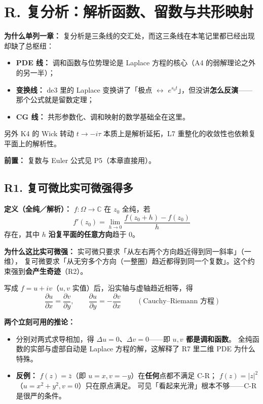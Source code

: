 \section{R. 复分析：解析函数、留数与共形映射}
\label{sec:complex}

\textbf{为什么单列一章：} 复分析是三条线的交汇处，而这三条线在本笔记里都已经出现却缺了总枢纽：
\begin{itemize}
  \item \textbf{PDE 线：} 调和函数与位势理论是 Laplace 方程的核心（A4 的弱解理论之外的另一半）；
  \item \textbf{变换线：} de3 里的 Laplace 变换讲了「极点 $\leftrightarrow$ $e^{s_0t}$」，但没讲\textbf{怎么反演}——
        那个公式就是留数定理；
  \item \textbf{CG 线：} 共形参数化、调和映射的数学基础全在这里。
\end{itemize}
另外 K4 的 Wick 转动 $t\to-i\tau$ 本质上是解析延拓，L7 重整化的收敛性也依赖复平面上的解析性。

\textbf{前置：} 复数与 Euler 公式见 P5（本章直接用）。

\subsection{R1. 复可微比实可微强得多}

\textbf{定义（全纯／解析）：} $f:\Omega\to\mathbb C$ 在 $z_0$ 全纯，若
\[
f'(z_0)=\lim_{h\to0}\frac{f(z_0+h)-f(z_0)}{h}
\]
存在，其中 $h$ \textbf{沿复平面的任意方向}趋于 $0$。

\textbf{为什么这比实可微强：} 实可微只要求「从左右两个方向趋近得到同一斜率」（一维），
复可微要求「从无穷多个方向（一整圈）趋近都得到同一个复数」。这个约束强到\textbf{会产生奇迹}（R2）。

写成 $f=u+iv$（$u,v$ 实值）后，沿实轴与虚轴趋近相等，得
\[
\boxed{\ \frac{\partial u}{\partial x}=\frac{\partial v}{\partial y},\qquad
\frac{\partial u}{\partial y}=-\frac{\partial v}{\partial x}\ }
\qquad(\text{Cauchy--Riemann 方程})
\]

\textbf{两个立刻可用的推论：}
\begin{itemize}
  \item 分别对两式求导相加，得 $\Delta u=0$、$\Delta v=0$——即 \textbf{$u,v$ 都是调和函数}。
        全纯函数的实部与虚部自动是 Laplace 方程的解，这解释了 R7 里二维 PDE 为什么特殊。
  \item \textbf{反例：} $f(z)=\bar z$（即 $u=x,v=-y$）在\textbf{任何}点都不满足 C-R；
        $f(z)=|z|^2$（$u=x^2+y^2,v=0$）只在原点满足。
        可见「看起来光滑」根本不够——C-R 是很严的条件。
\end{itemize}

